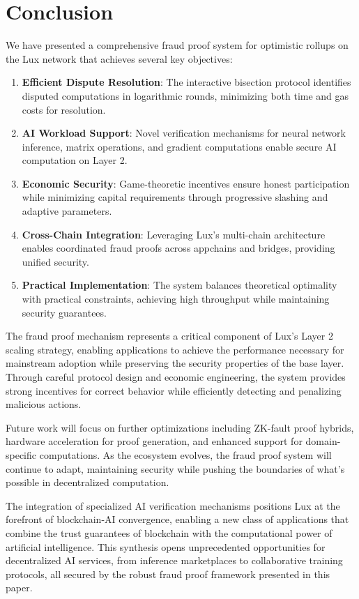 \section{Conclusion}


We have presented a comprehensive fraud proof system for optimistic rollups on the Lux network that achieves several key objectives:

\begin{enumerate}
    \item \textbf{Efficient Dispute Resolution}: The interactive bisection protocol identifies disputed computations in logarithmic rounds, minimizing both time and gas costs for resolution.
    
    \item \textbf{AI Workload Support}: Novel verification mechanisms for neural network inference, matrix operations, and gradient computations enable secure AI computation on Layer 2.
    
    \item \textbf{Economic Security}: Game-theoretic incentives ensure honest participation while minimizing capital requirements through progressive slashing and adaptive parameters.
    
    \item \textbf{Cross-Chain Integration}: Leveraging Lux's multi-chain architecture enables coordinated fraud proofs across appchains and bridges, providing unified security.
    
    \item \textbf{Practical Implementation}: The system balances theoretical optimality with practical constraints, achieving high throughput while maintaining security guarantees.
\end{enumerate}

The fraud proof mechanism represents a critical component of Lux's Layer 2 scaling strategy, enabling applications to achieve the performance necessary for mainstream adoption while preserving the security properties of the base layer. Through careful protocol design and economic engineering, the system provides strong incentives for correct behavior while efficiently detecting and penalizing malicious actions.

Future work will focus on further optimizations including ZK-fault proof hybrids, hardware acceleration for proof generation, and enhanced support for domain-specific computations. As the ecosystem evolves, the fraud proof system will continue to adapt, maintaining security while pushing the boundaries of what's possible in decentralized computation.

The integration of specialized AI verification mechanisms positions Lux at the forefront of blockchain-AI convergence, enabling a new class of applications that combine the trust guarantees of blockchain with the computational power of artificial intelligence. This synthesis opens unprecedented opportunities for decentralized AI services, from inference marketplaces to collaborative training protocols, all secured by the robust fraud proof framework presented in this paper.

\appendix

